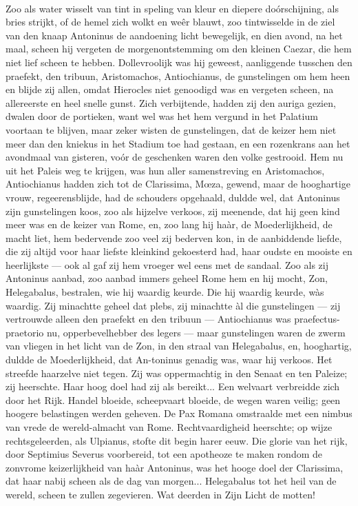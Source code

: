 \documentclass[a4paper, 12pt, oneside, dutch]{article}
\begin{document}
\paragraph{}
Zoo als water wisselt van tint in speling van kleur en diepere doórschijning, als bries strijkt, of de hemel zich wolkt en weêr blauwt, zoo tintwisselde in de ziel van den knaap Antoninus de aandoening licht bewegelijk, en dien avond, na het maal, scheen hij vergeten de morgenontstemming om den kleinen Caezar, die hem niet lief scheen te hebben. Dollevroolijk was hij geweest, aanliggende tusschen den praefekt, den tribuun, Aristomachos, Antiochianus, de gunstelingen om hem heen en blijde zij allen, omdat Hierocles niet genoodigd was en vergeten scheen, na allereerste en heel snelle gunst. Zich verbijtende, hadden zij den auriga gezien, dwalen door de portieken, want wel was het hem vergund in het Palatium voortaan te blijven, maar zeker wisten de gunstelingen, dat de keizer hem niet meer dan den kniekus in het Stadium toe had gestaan, en een rozenkrans aan het avondmaal van gisteren, voór de geschenken waren den volke gestrooid. Hem nu uit het Paleis weg te krijgen, was hun aller samenstreving en Aristomachos, Antiochianus hadden zich tot de Clarissima, Mœza, gewend, maar de hooghartige vrouw, regeerensblijde, had de schouders opgehaald, duldde wel, dat Antoninus zijn gunstelingen koos, zoo als hijzelve verkoos, zij meenende, dat hij geen kind meer was en de keizer van Rome, en, zoo lang hij haàr, de Moederlijkheid, de macht liet, hem bedervende zoo veel zij bederven kon, in de aanbiddende liefde, die zij altijd voor haar liefste kleinkind gekoesterd had, haar oudste en mooiste en heerlijkste --- ook al gaf zij hem vroeger wel eens met de sandaal. Zoo als zij Antoninus aanbad, zoo aanbad immers geheel Rome hem en hij mocht, Zon, Helegabalus, bestralen, wie hij waardig keurde. Die hij waardig keurde, wàs waardig. Zij minachtte geheel dat plebs, zij minachtte àl die gunstelingen --- zij vertrouwde alleen den praefekt en den tribuun --- Antiochianus was praefectus-praetorio nu, opperbevelhebber des legers --- maar gunstelingen waren de zwerm van vliegen in het licht van de Zon, in den straal van Helegabalus, en, hooghartig, duldde de Moederlijkheid, dat An-toninus genadig was, waar hij verkoos. Het streefde haarzelve niet tegen. Zij was oppermachtig in den Senaat en ten Paleize; zij heerschte. Haar hoog doel had zij als bereikt... Een welvaart verbreidde zich door het Rijk. Handel bloeide, scheepvaart bloeide, de wegen waren veilig; geen hoogere belastingen werden geheven. De Pax Romana omstraalde met een nimbus van vrede de wereld-almacht van Rome. Rechtvaardigheid heerschte; op wijze rechtsgeleerden, als Ulpianus, stofte dit begin harer eeuw. Die glorie van het rijk, door Septimius Severus voorbereid, tot een apotheoze te maken rondom de zonvrome keizerlijkheid van haàr Antoninus, was het hooge doel der Clarissima, dat haar nabij scheen als de dag van morgen... Helegabalus tot het heil van de wereld, scheen te zullen zegevieren. Wat deerden in Zijn Licht de motten!
\end{document}

